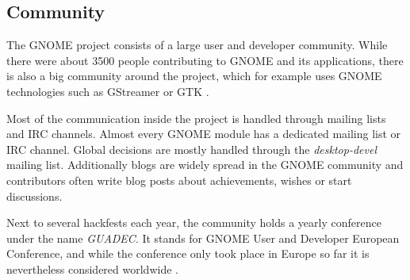 
\subsection{Community} %

The GNOME project consists of a large user and developer community. While there
were about 3500 people contributing to GNOME and its applications, there is
also a big community around the project, which for example uses GNOME
technologies such as GStreamer or \ac{GTK} \cite{GNOMEAbout,GNOMETeams}.

Most of the communication inside the project is handled through mailing lists
and \ac{IRC} channels. Almost every GNOME module has a dedicated mailing list
or \ac{IRC} channel. Global decisions are mostly handled through the
\emph{desktop-devel} mailing list. Additionally blogs are widely spread in the
GNOME community and contributors often write blog posts about achievements,
wishes or start discussions.

Next to several hackfests each year, the community holds a yearly conference
under the name \emph{GUADEC}. It stands for GNOME User and Developer European
Conference, and while the conference only took place in Europe so far it is
nevertheless considered worldwide \cite{GNOMEGUADEC}.

